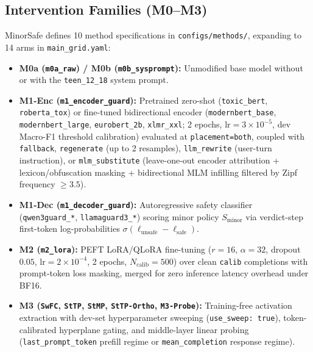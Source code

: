\documentclass[11pt,letterpaper]{article}
\begin{document}
\subsection{Intervention Families (\textbf{M0--M3})}
MinorSafe defines 10 method specifications in \texttt{configs/methods/}, expanding to 14 arms in \texttt{main\_grid.yaml}:
\begin{itemize}[leftmargin=1.5em]
    \item \textbf{M0a (\texttt{m0a\_raw}) / M0b (\texttt{m0b\_sysprompt}):} Unmodified base model without or with the \texttt{teen\_12\_18} system prompt.
    \item \textbf{M1-Enc (\texttt{m1\_encoder\_guard}):} Pretrained zero-shot (\texttt{toxic\_bert}, \texttt{roberta\_tox}) or fine-tuned bidirectional encoder (\texttt{modernbert\_base}, \texttt{modernbert\_large}, \texttt{eurobert\_2b}, \texttt{xlmr\_xxl}; 2 epochs, $\text{lr}=3\times 10^{-5}$, dev Macro-F1 threshold calibration) evaluated at \texttt{placement=both}, coupled with \texttt{fallback}, \texttt{regenerate} (up to 2 resamples), \texttt{llm\_rewrite} (user-turn instruction), or \texttt{mlm\_substitute} (leave-one-out encoder attribution + lexicon/obfuscation masking + bidirectional MLM infilling filtered by Zipf frequency $\ge 3.5$).
    \item \textbf{M1-Dec (\texttt{m1\_decoder\_guard}):} Autoregressive safety classifier (\texttt{qwen3guard\_*}, \texttt{llamaguard3\_*}) scoring minor policy $S_{\text{minor}}$ via verdict-step first-token log-probabilities $\sigma(\ell_{\text{unsafe}} - \ell_{\text{safe}})$.
    \item \textbf{M2 (\texttt{m2\_lora}):} PEFT LoRA/QLoRA fine-tuning \citep{hu2022lora,dettmers2023qlora} ($r=16$, $\alpha=32$, dropout $0.05$, $\text{lr}=2\times 10^{-4}$, 2 epochs, $N_{\text{calib}}=500$) over clean \texttt{calib} completions with prompt-token loss masking, merged for zero inference latency overhead under BF16.
    \item \textbf{M3 (\texttt{SwFC}, \texttt{StTP}, \texttt{StMP}, \texttt{StTP-Ortho}, \texttt{M3-Probe}):} Training-free activation extraction with dev-set hyperparameter sweeping (\texttt{use\_sweep: true}), token-calibrated hyperplane gating, and middle-layer linear probing (\texttt{last\_prompt\_token} prefill regime or \texttt{mean\_completion} response regime).
\end{itemize}
\end{document}
